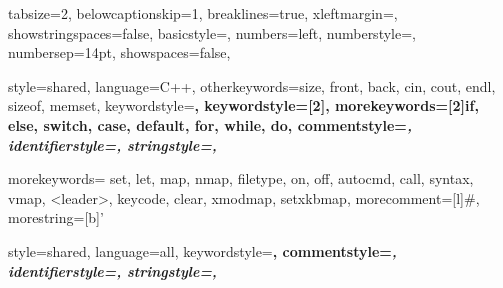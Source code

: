  {
  tabsize=2,
  belowcaptionskip=1\baselineskip,
  breaklines=true,
  xleftmargin=\parindent,
  showstringspaces=false,
  basicstyle=\fontsize{12}{14}\ttfamily,
  numbers=left,
  numberstyle=\tiny\color{gray},
  numbersep=14pt,
  showspaces=false,
}


 {
  style=shared,
  language=C++,
  otherkeywords={size, front, back, cin, cout, endl, sizeof, memset},
  keywordstyle=\bfseries\color{Blue}, %
  keywordstyle={[2]\bfseries\color{violet}}, %
  morekeywords=[2]{if, else, switch, case, default, for, while, do}, %
  commentstyle=\itshape\color{RoyalPurple},
  identifierstyle=\color{black},
  stringstyle=\color{OliveGreen},
}

 {
  morekeywords={ set, let, map, nmap, filetype, on, off, autocmd, call, syntax, vmap, <leader>, keycode, clear, xmodmap, setxkbmap},
  morecomment=[l]{\#}, %
  morestring=[b]' %
}

 {
  style=shared,
  language=all,
  keywordstyle=\bfseries\color{PineGreen},
  commentstyle=\itshape\color{JungleGreen},
  identifierstyle=\color{Orchid},
  stringstyle=\color{OliveGreen},
}

\lstset{escapechar=@}

